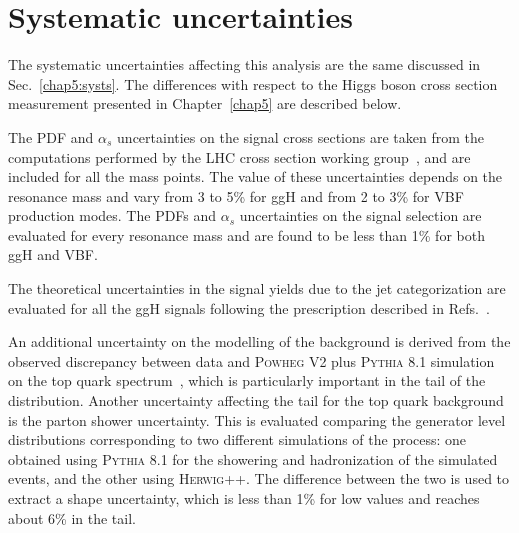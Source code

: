 \section{Systematic uncertainties}\label{chap6:Systematics}

The systematic uncertainties affecting this analysis are the same discussed in Sec.~\ref{chap5:systs}. The differences with respect to the Higgs boson cross section measurement presented in Chapter~\ref{chap5} are described below.

The PDF and $\alpha_s$ uncertainties on the signal cross sections are taken from the computations performed by the LHC cross section working group~\cite{YRtmp}, and are included for all the mass points. The value of these uncertainties depends on the resonance mass and vary from 3 to 5\% for ggH and from 2 to 3\% for VBF production modes. The PDFs and $\alpha_{s}$ uncertainties on the signal selection are evaluated for every resonance mass and are found to be less than 1\% for both ggH and VBF.

The theoretical uncertainties in the signal yields due to the jet categorization are evaluated for all the ggH signals following the prescription described in Refs.~\cite{Stewart:2011cf,Heinemeyer:2013tqa}.

An additional uncertainty on the modelling of the \ttbar background is derived from the observed discrepancy between data and \textsc{Powheg V2} plus \textsc{Pythia 8.1} simulation on the top quark \pt spectrum~\cite{Khachatryan:2015oqa}, which is particularly important in the tail of the \mti distribution. Another uncertainty affecting the \mti tail for the top quark background is the parton shower uncertainty. This is evaluated comparing the generator level \mti distributions corresponding to two different simulations of the \ttbar process: one obtained using \textsc{Pythia 8.1} for the showering and hadronization of the simulated events, and the other using \textsc{Herwig++}. The difference between the two is used to extract a shape uncertainty, which is less than 1\% for low \mti values and reaches about 6\% in the \mti tail.






